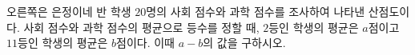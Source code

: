 \noindent\begin{minipage}[t]{0.58\linewidth}\vspace{0pt}\raggedright 오른쪽은 은정이네 반 학생 $20$명의 사회 점수와 과학 점수를 조사하여 나타낸 산점도이다. 사회 점수와 과학 점수의 평균으로 등수를 정할 때, $2$등인 학생의 평균은 $a$점이고 $11$등인 학생의 평균은 $b$점이다. 이때 $a-b$의 값을 구하시오.\end{minipage}\hfill\begin{minipage}[t]{0.4\linewidth}\vspace{0pt}\centering \resizebox{\ifdim\width>\linewidth\linewidth\else\width\fi}{!}{}\end{minipage}\par
